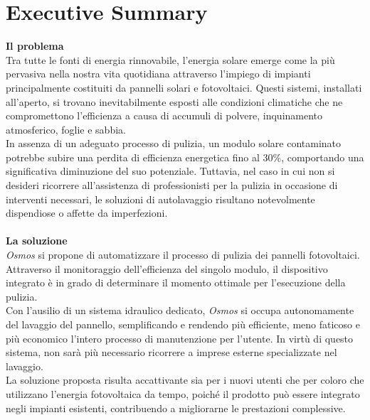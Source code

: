 \documentclass[a4paper, 12pt]{article}
\begin{document}
	\section{Executive Summary} %
	\textbf{Il problema}\\
	Tra tutte le fonti di energia rinnovabile, l'energia solare emerge come la più pervasiva nella nostra vita quotidiana attraverso l'impiego di impianti principalmente costituiti da pannelli solari e fotovoltaici. Questi sistemi, installati all'aperto, si trovano inevitabilmente esposti alle condizioni climatiche che ne compromettono l'efficienza a causa di accumuli di polvere, inquinamento atmosferico, foglie e sabbia.\\
	In assenza di un adeguato processo di pulizia, un modulo solare contaminato potrebbe subire una perdita di efficienza energetica fino al 30\%, comportando una significativa diminuzione del suo potenziale. Tuttavia, nel caso in cui non si desideri ricorrere all'assistenza di professionisti per la pulizia in occasione di interventi necessari, le soluzioni di autolavaggio risultano notevolmente dispendiose o affette da imperfezioni.\\\\
	\textbf{La soluzione}\\
	\emph{Osmos} si propone di automatizzare il processo di pulizia dei pannelli fotovoltaici. Attraverso il monitoraggio dell'efficienza del singolo modulo, il dispositivo integrato è in grado di determinare il momento ottimale per l'esecuzione della pulizia.\\
	Con l'ausilio di un sistema idraulico dedicato, \emph{Osmos} si occupa autonomamente del lavaggio del pannello, semplificando e rendendo più efficiente, meno faticoso e più economico l'intero processo di manutenzione per l'utente. In virtù di questo sistema, non sarà più necessario ricorrere a imprese esterne specializzate nel lavaggio.\\
	La soluzione proposta risulta accattivante sia per i nuovi utenti che per coloro che utilizzano l'energia fotovoltaica da tempo, poiché il prodotto può essere integrato negli impianti esistenti, contribuendo a migliorarne le prestazioni complessive.\\\\
\end{document}

